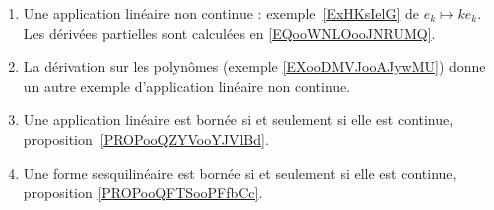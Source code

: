 
       \label{THEMEooYCBUooEnFdUg}
\begin{enumerate}
	\item
	      Une application linéaire non continue : exemple~\ref{ExHKsIelG} de \( e_k\mapsto ke_k\). Les dérivées partielles sont calculées en \eqref{EQooWNLOooJNRUMQ}.
	\item
	      La dérivation sur les polynômes (exemple \ref{EXooDMVJooAJywMU}) donne un autre exemple d'application linéaire non continue.
	\item
	      Une application linéaire est bornée si et seulement si elle est continue, proposition~\ref{PROPooQZYVooYJVlBd}.
      \item
          Une forme sesquilinéaire est bornée si et seulement si elle est continue, proposition \ref{PROPooQFTSooPFfbCc}.
\end{enumerate}
